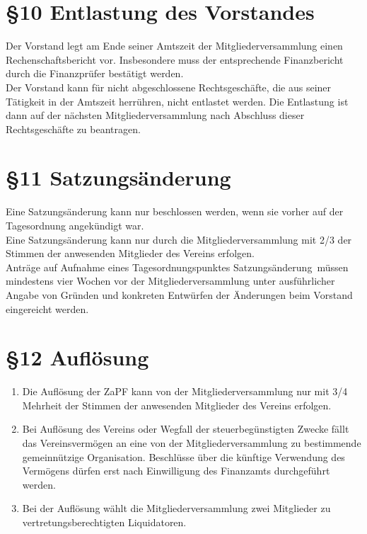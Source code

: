 \documentclass[ngerman]{article}
\begin{document}
\section*{§10 Entlastung des Vorstandes}
Der Vorstand legt am Ende seiner Amtszeit der Mitgliederversammlung einen Rechenschaftsbericht vor. Insbesondere muss der entsprechende Finanzbericht durch die Finanzprüfer bestätigt werden.\\
Der Vorstand kann für nicht abgeschlossene Rechtsgeschäfte, die aus seiner Tätigkeit in der Amtszeit herrühren, nicht entlastet werden. Die Entlastung ist dann auf der nächsten Mitgliederversammlung nach Abschluss dieser Rechtsgeschäfte zu beantragen.


\section*{§11 Satzungsänderung}
Eine Satzungsänderung kann nur beschlossen werden, wenn sie vorher auf der Tagesordnung angekündigt war.\\
Eine Satzungsänderung kann nur durch die Mitgliederversammlung mit 2/3 der Stimmen der anwesenden Mitglieder des Vereins erfolgen.\\
Anträge auf Aufnahme eines Tagesordnungspunktes \glqq Satzungsänderung\grqq\ müssen mindestens vier Wochen vor der Mitgliederversammlung unter ausführlicher Angabe von Gründen und konkreten Entwürfen der Änderungen beim Vorstand eingereicht werden.


\section*{§12 Auflösung}
\begin{enumerate}
 \item Die Auflösung der ZaPF kann von der Mitgliederversammlung nur mit 3/4 Mehrheit der Stimmen der anwesenden Mitglieder des Vereins erfolgen.
 \item Bei Auflösung des Vereins oder Wegfall der steuerbegünstigten Zwecke fällt das Vereinsvermögen an eine von der Mitgliederversammlung zu bestimmende gemeinnützige Organisation. Beschlüsse über die künftige Verwendung des Vermögens dürfen erst nach Einwilligung des Finanzamts durchgeführt werden.
 \item Bei der Auflösung wählt die Mitgliederversammlung zwei Mitglieder zu vertretungsberechtigten Liquidatoren.
\end{enumerate}
\end{document}
